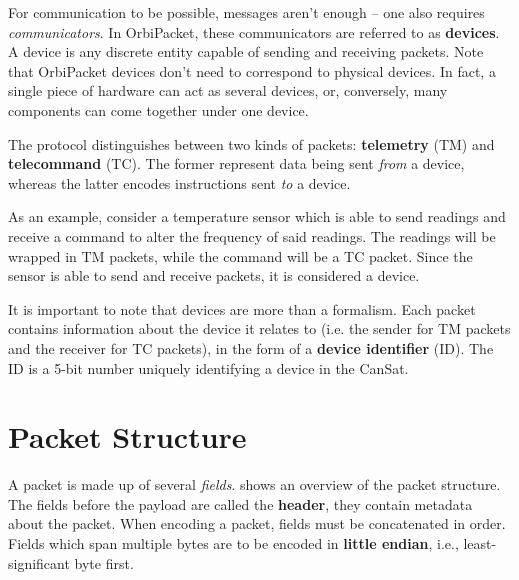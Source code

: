 \documentclass[a4paper,11pt,english]{article}
\begin{document}

For communication to be possible, messages aren't enough -- one also requires \textit{communicators}. In OrbiPacket, these communicators are referred to as \textbf{devices}. A device is any discrete entity capable of sending and receiving packets. Note that OrbiPacket devices don't need to correspond to physical devices. In fact, a single piece of hardware can act as several devices, or, conversely, many components can come together under one device.

The protocol distinguishes between two kinds of packets: \textbf{telemetry} (TM) and \textbf{telecommand} (TC). The former represent data being sent \textit{from} a device, whereas the latter encodes instructions sent \textit{to} a device.

As an example, consider a temperature sensor which is able to send readings and receive a command to alter the frequency of said readings. The readings will be wrapped in TM packets, while the command will be a TC packet. Since the sensor is able to send and receive packets, it is considered a device.

It is important to note that devices are more than a formalism. Each packet contains information about the device it relates to (i.e. the sender for TM packets and the receiver for TC packets), in the form of a \textbf{device identifier} (ID). The ID is a 5-bit number uniquely identifying a device in the CanSat.

\section[fields]{Packet Structure}

A packet is made up of several \textit{fields}.  shows an overview of the packet structure. The fields before the payload are called the \textbf{header}, they contain metadata about the packet. When encoding a packet, fields must be concatenated in order. Fields which span multiple bytes are to be encoded in \textbf{little endian}, i.e., least-significant byte first.
\end{document}
